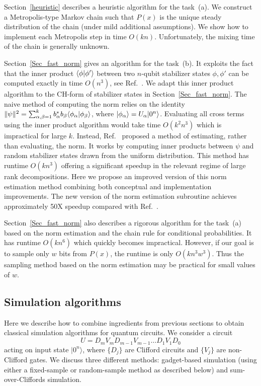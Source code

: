 Section~\ref{heuristic} describes a heuristic algorithm for the task~(a).
We construct a Metropolis-type Markov chain such that $P(x)$ is the unique steady distribution of the chain
(under mild additional assumptions).
We show how to implement each Metropolis step in time $O(k n)$.
Unfortunately, the mixing time of the chain is generally unknown.

Section~\ref{Sec_fast_norm} gives an algorithm for the task~(b).
It exploits the fact that the inner product $\langle \phi|\phi'\rangle$  between two $n$-qubit stabilizer
states $\phi,\phi'$ can be computed exactly in time $O(n^3)$,
see Ref.~\cite{garcia2012efficient,bravyi2016improved}.
We adapt this inner product algorithm to the CH-form 
of stabilizer states in Section~\ref{Sec_fast_norm}.
The naive method of computing the norm relies on the identity
$\|\psi\|^2=\sum_{\alpha,\beta=1}^k b_\alpha^* b_\beta \langle \phi_\alpha|\phi_\beta\rangle$, where
$|\phi_\alpha\rangle=U_\alpha|0^n\rangle$. Evaluating all cross terms using the inner 
product algorithm would take time $O(k^2 n^3)$ which
is impractical for large $k$.
Instead, Ref.~\cite{bravyi2016improved} proposed 
a method of estimating, rather than evaluating, the norm.  
It works by computing inner products between $\psi$ and random stabilizer states
drawn from the uniform distribution. 
This method has runtime $O(k n^3)$
offering a significant speedup in the relevant regime of large rank decompositions. 
Here we propose an improved version of this norm estimation 
method combining both conceptual  and implementation improvements.
The new version of the norm estimation subroutine achieves approximately 
50X speedup compared with Ref.~\cite{bravyi2016improved}.

Section~\ref{Sec_fast_norm}  also
describes a rigorous  algorithm  for the task~(a)
based on the norm estimation and the chain rule for conditional probabilities.
It has runtime $O(k n^6)$ which quickly becomes impractical.
However,  if our goal is to sample only $w$ bits from $P(x)$, 
the runtime is only  $O(k n^3 w^3)$.
Thus the sampling method based on the norm estimation may be practical for small values of $w$.

\subsection{Simulation algorithms}
\label{sec:simulations}
Here we describe how to combine ingredients from previous sections to obtain classical simulation algorithms for quantum circuits.  We consider a circuit
\begin{equation}
U=D_m V_mD_{m-1}V_{m-1}\ldots D_1 V_1 D_0
\label{eq:circuit}
\end{equation}
acting on input state $|0^n\rangle$, where $\{D_j\}$ are Clifford circuits and $\{V_j\}$ are non-Clifford gates.  We discuss three different methods:  gadget-based simulation (using either a fixed-sample or random-sample method as described below) and sum-over-Cliffords simulation.  

